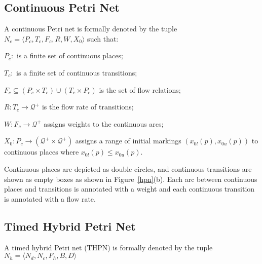 \documentclass[11pt,times]{article}
\begin{document}
\subsection{\label{cpn_sec}Continuous Petri Net}

A continuous Petri net is formally denoted by the tuple $N_c = \langle P_c,
T_c, F_c, R, W, X_0 \rangle$ such that:

\begin{description}
\item $P_c:$ is a finite set of continuous places;
\item $T_c:$ is a finite set of continuous transitions;
\item $F_c \subseteq (P_c \times T_c) \cup (T_c \times P_c)$ is the
  set of flow relations;
\item $R: T_c \rightarrow \mathcal{Q}^+$ is the flow rate of transitions;
\item $W: F_c \rightarrow \mathcal{Q}^+$ assigns weights to the 
      continuous arcs;
\item $X_0: P_c \rightarrow (\mathcal{Q}^+ \times \mathcal{Q}^+)$
  assigns a range of initial markings $(x_{0l}(p), x_{0u}(p))$ to continuous
  places where $x_{0l}(p) \leq x_{0u}(p)$.
\end{description}

Continuous places are depicted as double circles, and continuous transitions 
are shown as empty boxes as shown in Figure~\ref{hpn}(b).  Each arc between
continuous places and transitions is annotated with a weight and each 
continuous transition is annotated with a flow rate.

\subsection{\label{hpn_sec}Timed Hybrid Petri Net}

A timed hybrid Petri net (THPN) is formally denoted by the tuple
$N_h = \langle N_d, N_c, F_h, B, D \rangle$

\end{document}
